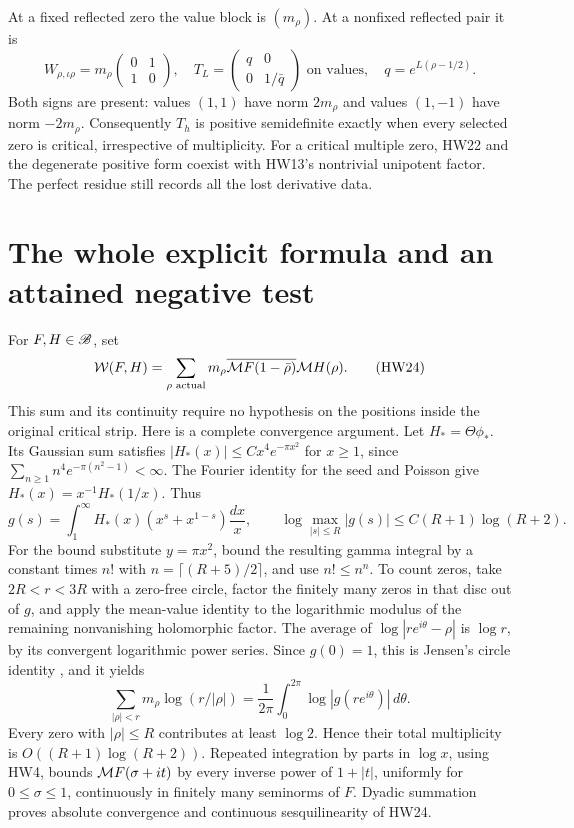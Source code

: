At a fixed reflected zero the value block is \((m_\rho)\).
At a nonfixed reflected pair it is
\[
 W_{\rho,\iota\rho}
   =m_\rho\begin{pmatrix}0&1\\1&0\end{pmatrix},
 \quad
 T_L=\begin{pmatrix}q&0\\0&1/\bar q\end{pmatrix}
       \text{ on values},\quad q=e^{L(\rho-1/2)}.
 \tag{HW23}\label{hw:hyperbolic}
\]
Both signs are present: values \((1,1)\) have norm \(2m_\rho\)
and values \((1,-1)\) have norm \(-2m_\rho\).
Consequently \(T_h\) is positive semidefinite exactly when
every selected zero is critical, irrespective of multiplicity.
For a critical multiple zero, HW22 and the degenerate positive
form coexist with HW13's nontrivial unipotent factor.
The perfect residue still records all the lost derivative data.

\section{The whole explicit formula and an attained negative test}

For \(F,H\in\mathscr B\), set
\[
 \mathcal W(F,H)=\sum_{\rho\text{ actual}}
       m_\rho\overline{\mathcal M F(1-\bar\rho)}\mathcal M H(\rho).
 \tag{HW24}\label{hw:globalweil}
\]
This sum and its continuity require no hypothesis on the positions
inside the original critical strip. Here is a complete convergence
argument. Let \(H_*=\Theta\phi_*\). Its Gaussian sum satisfies
\(|H_*(x)|\le Cx^4e^{-\pi x^2}\) for \(x\ge1\), since
\(\sum_{n\ge1}n^4e^{-\pi(n^2-1)}<\infty\).
The Fourier identity for the seed and Poisson give
\(H_*(x)=x^{-1}H_*(1/x)\). Thus
\[
 g(s)=\int_1^\infty H_*(x)(x^s+x^{1-s})\frac{dx}{x},
 \qquad \log\max_{|s|\le R}|g(s)|
              \le C(R+1)\log(R+2).
 \tag{HW25}
\]
For the bound substitute \(y=\pi x^2\), bound the resulting
gamma integral by a constant times \(n!\) with
\(n=\lceil(R+5)/2\rceil\), and use \(n!\le n^n\).
To count zeros, take \(2R<r<3R\) with a zero-free circle,
factor the finitely many zeros in that disc out of \(g\), and
apply the mean-value identity to the logarithmic modulus of the
remaining nonvanishing holomorphic factor. The average of
\(\log|re^{i\theta}-\rho|\) is \(\log r\), by its convergent
logarithmic power series. Since \(g(0)=1\), this is Jensen's
circle identity \cite{HW-Jensen}, and it yields
\[
 \sum_{|\rho|<r}m_\rho\log(r/|\rho|)
  =\frac1{2\pi}\int_0^{2\pi}\log|g(re^{i\theta})|\,d\theta .
 \tag{HW26}
\]
Every zero with \(|\rho|\le R\) contributes at least \(\log2\).
Hence their total multiplicity is \(O((R+1)\log(R+2))\).
Repeated integration by parts in \(\log x\), using HW4,
bounds \(\mathcal M F(\sigma+it)\) by every inverse power of
\(1+|t|\), uniformly for \(0\le\sigma\le1\), continuously
in finitely many seminorms of \(F\).
Dyadic summation proves absolute convergence and continuous
sesquilinearity of HW24.

